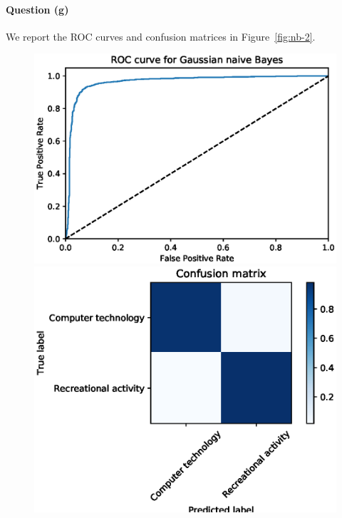 \documentclass[letterpaper]{article}
\begin{document}
\paragraph{Question (g)}
We report the ROC curves and confusion matrices in Figure~\ref{fig:nb-2}.
\begin{figure}[!htb]
\centering
\begin{minipage}{0.5\textwidth}
\includegraphics[width=1.0\textwidth]{roc-lsi-naive-bayes}
\end{minipage}%
\begin{minipage}{0.5\textwidth}
\includegraphics[width=1.0\textwidth]{conf-mat-lsi-naive-bayes}
\end{minipage}
\begin{minipage}{0.5\textwidth}

\end{minipage}
\end{figure}
\end{document}
